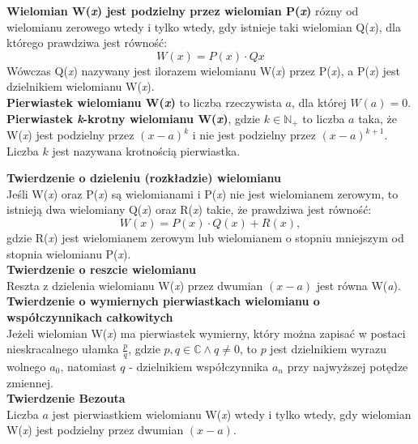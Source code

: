 \documentclass[14pt,a4paper]{extarticle}
\begin{document}
\noindent\textbf{Wielomian W(\textit{x}) jest podzielny przez wielomian P(\textit{x})} rózny od wielomianu zerowego wtedy i tylko wtedy,
gdy istnieje taki wielomian Q(\textit{x}), dla którego prawdziwa jest równość:
$$W(x) = P(x) \cdot Q{x}$$
Wówczas Q(\textit{x}) nazywany jest ilorazem wielomianu W(\textit{x}) przez P(\textit{x}), a P(\textit{x}) 
jest dzielnikiem wielomianu W(\textit{x}).\\

\smallskip
\noindent\textbf{Pierwiastek wielomianu W(\textit{x})} to liczba rzeczywista $a$, dla której $W(a) = 0$.\\

\smallskip
\noindent\textbf{Pierwiastek \textit{k}-krotny wielomianu W(\textit{x})}, gdzie $k \in \mathbb{N}_{+}$ to liczba $a$ taka, że W(\textit{x})
jest podzielny przez $(x-a)^{k}$ i nie jest podzielny przez $(x-a)^{k+1}$. Liczba $k$ jest nazywana krotnością pierwiastka.\\

\bigskip

\noindent\textbf{Twierdzenie o dzieleniu (rozkładzie) wielomianu}\\
Jeśli W(\textit{x}) oraz P(\textit{x}) są wielomianami i P(\textit{x}) nie jest wielomianem zerowym, 
to istnieją dwa wielomiany Q(\textit{x}) oraz R(\textit{x}) takie, że prawdziwa jest równość:
$$W(x) = P(x)\cdot Q(\textit{x})+R(x),$$
gdzie R(\textit{x}) jest wielomianem zerowym lub wielomianem o stopniu mniejszym od stopnia wielomianu P(\textit{x}).\\

\smallskip
\noindent\textbf{Twierdzenie o reszcie wielomianu}\\
Reszta z dzielenia wielomianu W(\textit{x}) przez dwumian $(x - a)$ jest równa W(\textit{a}).\\

\smallskip
\newpage
\noindent\textbf{Twierdzenie o wymiernych pierwiastkach wielomianu o współczynnikach całkowitych}\\
Jeżeli wielomian W(\textit{x}) ma pierwiastek wymierny, który można zapisać w postaci nieskracalnego ułamka $\frac{p}{q}$, gdzie $p, q \in \mathbb{C} \land q \neq 0$, to 
$p$ jest dzielnikiem wyrazu wolnego $a_{0}$, natomiast $q$ - dzielnikiem współczynnika $a_{n}$ przy najwyższej potędze zmiennej.\\

\smallskip
\noindent\textbf{Twierdzenie Bezouta}\\
Liczba $a$ jest pierwiastkiem wielomianu W(\textit{x}) wtedy i tylko wtedy, gdy wielomian W(\textit{x}) jest podzielny przez dwumian $(x - a)$.\\
\end{document}
